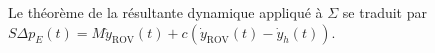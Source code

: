 \begin{multicols}{2}
Le théorème de la résultante dynamique appliqué à $\Sigma$ se traduit par 
$ S\Delta p_E(t)=M\ddot y_{\text{ROV}}(t)+c(\dot y_{\text{ROV}}(t)-\dot y_h(t) )$.



%
%
%
%
% 
% 

\end{multicols}
